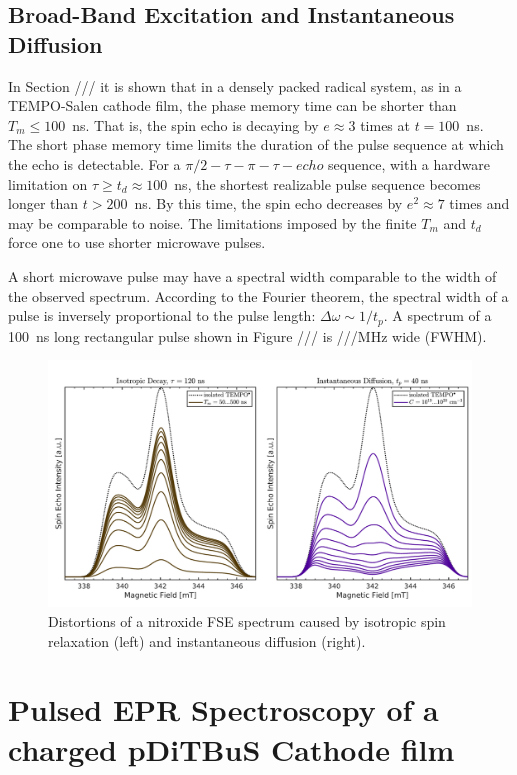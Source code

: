 \subsection{Broad-Band Excitation and Instantaneous Diffusion}
In Section /// it is shown that in a densely packed radical system, as in a TEMPO-Salen cathode film, the phase memory time can be shorter than $T_m\leq100$~ns. That is, the spin echo is decaying by $e\approx3$ times at $t=100$~ns. The short phase memory time limits the duration of the pulse sequence at which the echo is detectable. For a $\pi/2-\tau-\pi-\tau-echo$ sequence, with a hardware limitation on $\tau\geq t_d\approx100$~ns, the shortest realizable pulse sequence becomes longer than $t>200$~ns. By this time, the spin echo decreases by $e^2\approx7$ times and may be comparable to noise. The limitations imposed by the finite $T_m$ and $t_d$ force one to use shorter microwave pulses. 
\par
A short microwave pulse may have a spectral width comparable to the width of the observed spectrum. According to the Fourier theorem, the spectral width of a pulse is inversely proportional to the pulse length: $\Delta\omega\sim 1/t_p$. A spectrum of a 100~ns long rectangular pulse shown in Figure /// is ///MHz wide (FWHM). 

\begin{figure}[h]
\center
	\includegraphics[width=1\textwidth]{./pulse/figures/FGMR/ID/ID_vs_ISO.pdf}
	\caption{Distortions of a nitroxide FSE spectrum caused by isotropic spin relaxation (left) and instantaneous diffusion (right).}
	\label{fig:iso_vs_id}
\end{figure}


\section{Pulsed EPR Spectroscopy of a charged pDiTBuS Cathode film}
